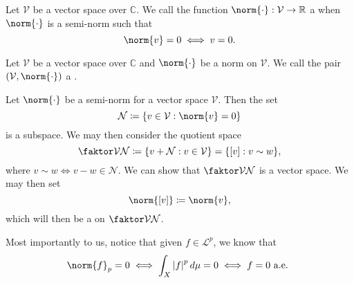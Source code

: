 \documentclass[notoc,notitlepage]{tufte-book}
\begin{document}
\begin{defn}[Norm]\label{defn:norm}
  Let $\mathcal{V}$ be a vector space over $\mathbb{C}$.
  We call the function $\norm{\cdot} : \mathcal{V} \to \mathbb{R}$ a 
  when $\norm{\cdot}$ is a semi-norm such that
  \begin{equation*}
    \norm{v} = 0 \iff v = 0.
  \end{equation*}
\end{defn}

\begin{defn}\label{defn:normed_space}
  Let $\mathcal{V}$ be a vector space over $\mathbb{C}$
  and $\norm{\cdot}$ be a norm on $\mathcal{V}$.
  We call the pair $(\mathcal{V}, \norm{\cdot})$ a .
\end{defn}

\begin{note}
  Let $\norm{\cdot}$ be a semi-norm for a vector space $\mathcal{V}$.
  Then the set
  \begin{equation*}
    \mathcal{N} \coloneqq \{ v \in \mathcal{V} : \norm{v} = 0 \}
  \end{equation*}
  is a subspace.
  We may then consider the quotient space
  \begin{equation*}
    \quotient{\mathcal{V}}{\mathcal{N}}
    \coloneqq \{ v + \mathcal{N} : v \in \mathcal{V} \}
    = \{ [v] : v \sim w \},
  \end{equation*}
  where $v \sim w \iff v - w \in \mathcal{N}$.
  We can show that $\quotient{\mathcal{V}}{\mathcal{N}}$ is a vector space.
  We may then set
  \begin{equation*}
    \norm{[v]} \coloneqq \norm{v},
  \end{equation*}
  which will then be a  on $\quotient{\mathcal{V}}{\mathcal{N}}$.

  Most importantly to us, notice that given $f \in \mathcal{L}^p$,
  we know that
  \begin{equation*}
    \norm{f}_p = 0 \iff \int_{X} \abs{f}^p \dif{\mu} = 0 \iff f = 0 \text{ a.e. }
  \end{equation*}
\end{note}
\end{document}
